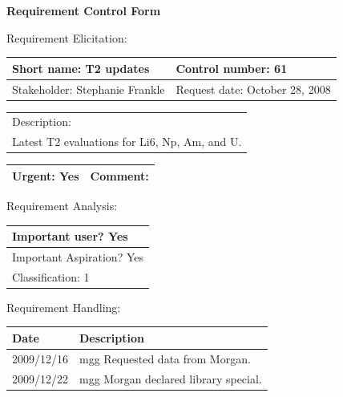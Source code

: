 \begin{center}\Large\bf
Requirement Control Form
\end{center}
\vspace{24pt}

Requirement Elicitation:

\begin{tabular}{|p{211pt}|p{211pt}|} \hline
Short name: T2 updates & Control number: 61\\ \hline
Stakeholder: Stephanie Frankle & Request date: October 28, 2008\\
\end{tabular}
\begin{tabular}{|p{433pt}|} \hline
Description: \\ 
Latest T2 evaluations for Li6, Np, Am, and U.\\
\hline
\end{tabular} 
\begin{tabular}{|p{211pt}|p{211pt}|} \hline
Urgent: Yes & Comment: \\ \hline
\end{tabular}

\vspace{24pt}

Requirement Analysis:

\begin{tabular}{|p{433pt}|} \hline
Important user? Yes \\ \hline
Important Aspiration? Yes \\ \hline
Classification: 1 \\ \hline
\end{tabular}
\vspace{24pt}

Requirement Handling:

\begin{tabular}{|p{72pt}|p{351pt}|} \hline
Date & Description \\ \hline
2009/12/16 & mgg Requested data from Morgan. \\ \hline
2009/12/22 & mgg Morgan declared library special. \\ \hline
\end{tabular}
